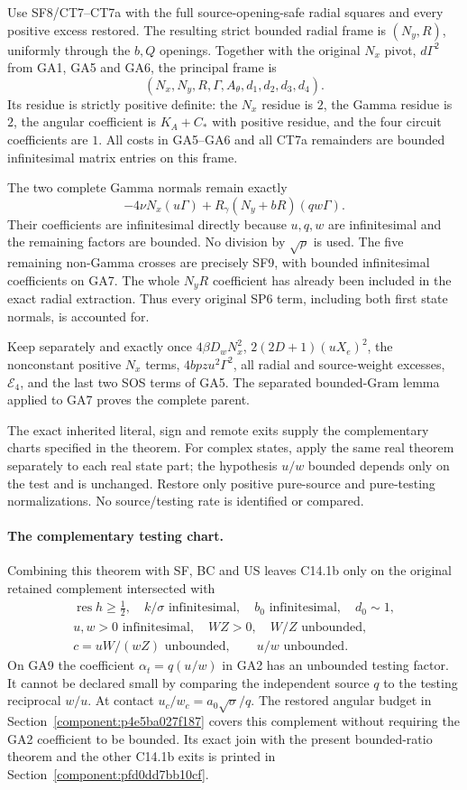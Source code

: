 Use SF8/CT7--CT7a with the full source-opening-safe radial squares
and every positive excess restored. The resulting strict bounded
radial frame is $(N_y,R)$, uniformly through the $b,Q$ openings.
Together with the original $N_x$ pivot, $d\Gamma^2$ from GA1,
GA5 and GA6, the principal frame is
\[
       (N_x,N_y,R,\Gamma,A_\theta,d_1,d_2,d_3,d_4).
       \tag{GA7}
\]
Its residue is strictly positive definite: the $N_x$ residue is
$2$, the Gamma residue is $2$, the angular coefficient is
$K_A+C_*$ with positive residue, and the four circuit coefficients
are $1$. All costs in GA5--GA6 and all CT7a remainders are bounded
infinitesimal matrix entries on this frame.

The two complete Gamma normals remain exactly
\[
      -4\nu N_x(u\Gamma)
       +R_\gamma(N_y+bR)(qw\Gamma).
       \tag{GA8}
\]
Their coefficients are infinitesimal directly because $u,q,w$ are
infinitesimal and the remaining factors are bounded. No division
by $\sqrt\rho$ is used. The five remaining non-Gamma crosses are
precisely SF9, with bounded infinitesimal coefficients on GA7.
The whole $N_yR$ coefficient has already been included in the
exact radial extraction. Thus every original SP6 term, including
both first state normals, is accounted for.

Keep separately and exactly once $4\beta D_wN_x^2$,
$2(2D+1)(uX_e)^2$, the nonconstant positive $N_x$ terms,
$4bpzu^2\Gamma^2$, all radial and source-weight excesses,
$\mathcal E_4$, and the last two SOS terms of GA5. The separated
bounded-Gram lemma applied to GA7 proves the complete parent.

The exact inherited literal, sign and remote exits supply the
complementary charts specified in the theorem. For complex states,
apply the same real theorem separately to each real state part;
the hypothesis $u/w$ bounded depends only on the test and is
unchanged. Restore only positive pure-source and pure-testing
normalizations. No source/testing rate is identified or compared.

\paragraph{The complementary testing chart.}
Combining this theorem with SF, BC and US leaves C14.1b only on
the original retained complement intersected with
\[
\begin{gathered}
 \operatorname{res}h\ge\tfrac12,\quad k/\sigma\text{ infinitesimal},
 \quad b_0\text{ infinitesimal},\quad d_0\sim1,\\
 u,w>0\text{ infinitesimal},\quad WZ>0,\quad W/Z\text{ unbounded},\\
 c=uW/(wZ)\text{ unbounded},\qquad u/w\text{ unbounded}.
\end{gathered}\tag{GA9}
\]
On GA9 the coefficient $\alpha_t=q(u/w)$ in GA2 has an unbounded testing factor. It cannot be declared small by comparing the independent source $q$ to the testing reciprocal $w/u$. At contact $u_c/w_c=a_0\sqrt\sigma/q$. The restored angular budget in Section~\ref{component:p4e5ba027f187} covers this complement without requiring the GA2 coefficient to be bounded. Its exact join with the present bounded-ratio theorem and the other C14.1b exits is printed in Section~\ref{component:pfd0dd7bb10cf}.


